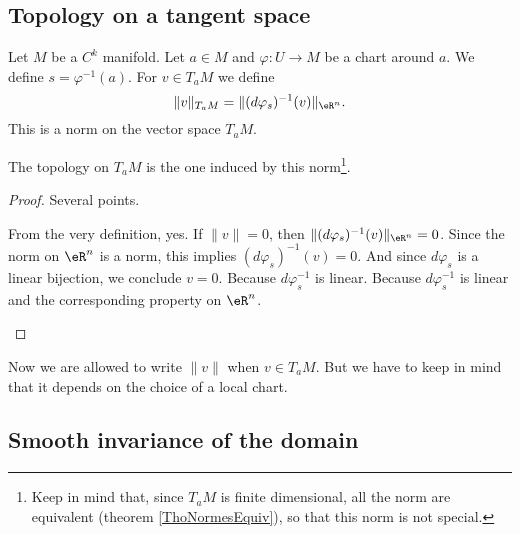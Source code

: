 \subsection{Topology on a tangent space}

\begin{propositionDef}        \label{PROPooHJOXooMGANfd}
	Let \( M\) be a \( C^k\) manifold. Let \( a\in M\) and \( \varphi\colon U\to M\) be a chart around \( a\). We define \( s=\varphi^{-1}(a)\). For \( v\in T_aM\) we define
	\begin{equation}
		\| v \|_{T_aM}=\| (d\varphi_s)^{-1}(v) \|_{\eR^n}.
	\end{equation}
	This is a norm on the vector space \( T_aM\).

	The topology on \( T_aM\) is the one induced by this norm\footnote{Keep in mind that, since \( T_aM\) is finite dimensional, all the norm are equivalent (theorem \ref{ThoNormesEquiv}), so that this norm is not special.}.
\end{propositionDef}

\begin{proof}
	Several points.
	\begin{subproof}
		\spitem[\( \| v \|\geq 0\)]
		From the very definition, yes.
		\spitem[\( \| v \|=0\) si et seulement si \( v=0\)]
		If \( \| v \|=0\), then \( \| (d\varphi_s)^{-1}(v) \|_{\eR^n}=0\). Since the norm on \( \eR^n\) is a norm, this implies \( (d\varphi_s)^{-1}(v)=0\). And since \( d\varphi_s\) is a linear bijection, we conclude \( v=0\).
		\spitem[\( \| \lambda v \|=| \lambda |\| v \|\)]
		Because \( d\varphi_s^{-1}\) is linear.
		\spitem[\( \| v+w \|\leq \| v \|+\| v \|\)]
		Because \( d\varphi_s^{-1}\) is linear and the corresponding property on \( \eR^n\).
	\end{subproof}
\end{proof}

Now we are allowed to write \( \| v \|\) when \( v\in T_aM\). But we have to keep in mind that it depends on the choice of a local chart.

\subsection{Smooth invariance of the domain}


